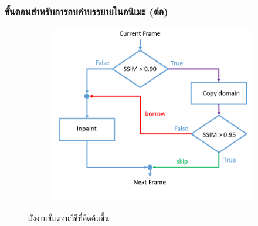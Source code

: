 \documentclass[xcolor=dvipsnames, xetex,serif]{beamer}
\numberwithin{equation}{section}
\begin{document}
	\begin{frame}
		\frametitle{ขั้นตอนสำหรับการลบคำบรรยายในอนิเมะ (ต่อ)}
		\begin{figure}[H]
			\centering
			\begin{subfigure}{0.6\linewidth}
				\centering
				\includegraphics[width=1\linewidth]{images/method_anime/flowchart-skipandborrow.png}
			\end{subfigure}
			\caption{ผังงานขั้นตอนวิธีที่คิดค้นขึ้น}
		\end{figure}
	\end{frame}
\end{document}
